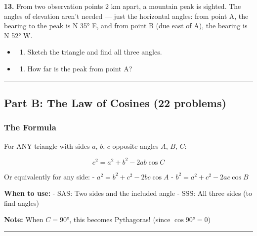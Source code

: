 \documentclass[
  11pt,
]{article}
\providecommand{\tightlist}{%
  \setlength{\itemsep}{0pt}\setlength{\parskip}{0pt}}
\begin{document}
\textbf{13.} From two observation points 2 km apart, a mountain peak is
sighted. The angles of elevation aren't needed --- just the horizontal
angles: from point A, the bearing to the peak is N 35° E, and from point
B (due east of A), the bearing is N 52° W.

\begin{itemize}
\item
  \begin{enumerate}
  \def\labelenumi{(\alph{enumi})}
  \tightlist
  \item
    Sketch the triangle and find all three angles.
  \end{enumerate}
\item
  \begin{enumerate}
  \def\labelenumi{(\alph{enumi})}
  \setcounter{enumi}{1}
  \tightlist
  \item
    How far is the peak from point A?
  \end{enumerate}
\end{itemize}

\begin{center}\rule{0.5\linewidth}{0.5pt}\end{center}

\hypertarget{part-b-the-law-of-cosines-22-problems}{%
\subsection{Part B: The Law of Cosines (22
problems)}\label{part-b-the-law-of-cosines-22-problems}}

\hypertarget{the-formula-1}{%
\subsubsection{The Formula}\label{the-formula-1}}

For ANY triangle with sides \(a\), \(b\), \(c\) opposite angles \(A\),
\(B\), \(C\):

\[\boxed{c^2 = a^2 + b^2 - 2ab\cos C}\]

Or equivalently for any side: - \(a^2 = b^2 + c^2 - 2bc\cos A\) -
\(b^2 = a^2 + c^2 - 2ac\cos B\)

\textbf{When to use:} - SAS: Two sides and the included angle - SSS: All
three sides (to find angles)

\textbf{Note:} When \(C = 90°\), this becomes Pythagoras! (since
\(\cos 90° = 0\))

\begin{center}\rule{0.5\linewidth}{0.5pt}\end{center}
\end{document}
